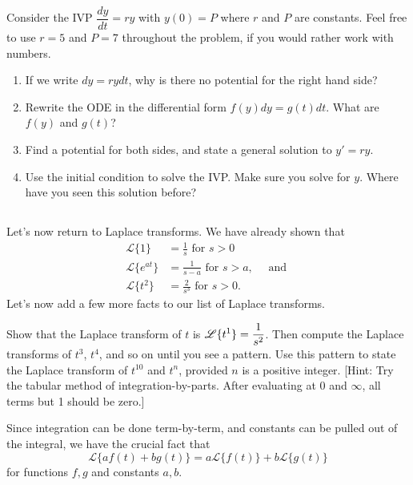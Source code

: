 \begin{problem}
Consider the IVP $\dfrac{dy}{dt}=ry$ with $y(0)=P$ where $r$ and $P$ are constants.  Feel free to use $r=5$ and $P=7$ throughout the problem, if you would rather work with numbers.  
\begin{enumerate}
 \item If we write $dy = rydt$, why is there no potential for the right hand side? 
 \item Rewrite the ODE in the differential form $f(y)dy=g(t)dt$.  What are $f(y)$ and $g(t)$?
 \item Find a potential for both sides, and state a general solution to $y'=ry$.
 \item Use the initial condition to solve the IVP.  Make sure you solve for $y$.  Where have you seen this solution before? 
\end{enumerate}
\end{problem}

\subsection*{\ideaD}

Let's now return to Laplace transforms. We have already shown that 
\begin{align*}
\mathscr{L}\{1\} &= \frac{1}{s}\text{ for $s>0$}\\
\mathscr{L}\{e^{at}\} &= \frac{1}{s-a} \text{ for $s>a$}, \quad \text{ and }\\
\mathscr{L}\{t^2\} &= \frac{2}{s^3}\text{ for $s>0$}.
\end{align*}
Let's now add a few more facts to our list of Laplace transforms. 


\begin{problem}
Show that the Laplace transform of $t$ is $\displaystyle\mathscr{L}\{t^1\} = \frac{1}{s^2}$.
Then compute the Laplace transforms of $t^3$, $t^4$, and so on until you see a pattern. 
Use this pattern to state the Laplace transform of $t^10$ and $t^n$, provided $n$ is a positive integer.
[Hint: Try the tabular method of integration-by-parts. After evaluating at 0 and $\infty$, all terms but 1 should be zero.]
\end{problem}

\begin{theorem}\label{linear combination of laplace transforms}
Since integration can be done term-by-term, and constants can be pulled out of the integral, we have the crucial fact that $$\mathscr{L}\{af(t)+bg(t)\}=a\mathscr{L}\{f(t)\}+b\mathscr{L}\{g(t)\}$$ for functions $f,g$ and constants $a,b$.  
\end{theorem}

